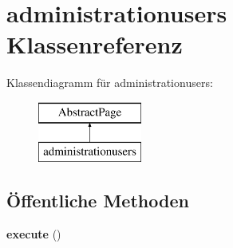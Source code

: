 \hypertarget{classadministrationusers}{}\section{administrationusers Klassenreferenz}
\label{classadministrationusers}
Klassendiagramm für administrationusers\+:\begin{figure}[H]
\begin{center}
\leavevmode
\includegraphics[height=2.000000cm]{classadministrationusers}
\end{center}
\end{figure}
\subsection*{Öffentliche Methoden}
\begin{DoxyCompactItemize}
\item 
\mbox{\label{classadministrationusers_a3f91ee01afb4173dcab6ed860cf01451}} 
{\bfseries execute} ()
\end{DoxyCompactItemize}
